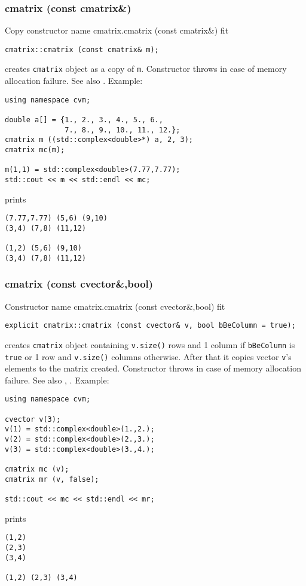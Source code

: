 \subsubsection{cmatrix (const cmatrix\&)}
Copy constructor%
\pdfdest name {cmatrix.cmatrix (const cmatrix&)} fit
\begin{verbatim}
cmatrix::cmatrix (const cmatrix& m);
\end{verbatim}
creates  \verb"cmatrix" object as a copy of \verb"m".
Constructor throws  
in case of memory allocation failure.
See also .
Example:
\begin{Verbatim}
using namespace cvm;

double a[] = {1., 2., 3., 4., 5., 6.,
              7., 8., 9., 10., 11., 12.};
cmatrix m ((std::complex<double>*) a, 2, 3);
cmatrix mc(m);

m(1,1) = std::complex<double>(7.77,7.77);
std::cout << m << std::endl << mc;
\end{Verbatim}
prints
\begin{Verbatim}
(7.77,7.77) (5,6) (9,10)
(3,4) (7,8) (11,12)

(1,2) (5,6) (9,10)
(3,4) (7,8) (11,12)
\end{Verbatim}
\newpage




\subsubsection{cmatrix (const cvector\&,bool)}
Constructor%
\pdfdest name {cmatrix.cmatrix (const cvector&,bool)} fit
\begin{verbatim}
explicit cmatrix::cmatrix (const cvector& v, bool bBeColumn = true);
\end{verbatim}
creates  \verb"cmatrix" object containing \verb"v.size()" rows and
1 column if \verb"bBeColumn" is \verb"true" or 1 row and
\verb"v.size()" columns otherwise.
After that it copies vector \verb"v"'s elements to
the matrix created.
Constructor throws  
in case of memory allocation failure.
See also , .
Example:
\begin{Verbatim}
using namespace cvm;

cvector v(3);
v(1) = std::complex<double>(1.,2.);
v(2) = std::complex<double>(2.,3.);
v(3) = std::complex<double>(3.,4.);

cmatrix mc (v);
cmatrix mr (v, false);

std::cout << mc << std::endl << mr;
\end{Verbatim}
prints
\begin{Verbatim}
(1,2)
(2,3)
(3,4)

(1,2) (2,3) (3,4)
\end{Verbatim}
\newpage




